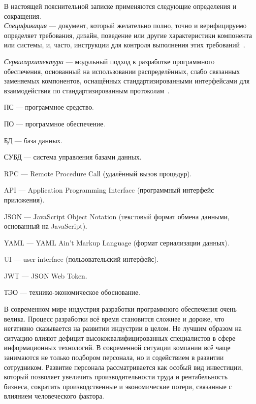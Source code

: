 \label{sec:definitions}
\label{sec:introduction}
\setcounter{page}{6}

В настоящей пояснительной записке применяются следующие определения и сокращения.
\\

\emph{Спецификация} — документ, который желательно полно, точно и верифицируемо определяет требования, дизайн, поведение или другие характеристики компонента или системы, и, часто, инструкции для контроля выполнения этих требований~\cite{istqb_specification}.

\emph{Сервис архитектура} — модульный подход к разработке программного обеспечения, основанный на использовании распределённых, слабо связанных заменяемых компонентов, оснащённых стандартизированными интерфейсами для взаимодействия по стандартизированным протоколам~\cite{wiki_soa}.

ПС — программное средство.

ПО — программное обеспечение.

БД — база данных.

СУБД — система управления базами данных.

RPC — Remote Procedure Call (удалённый вызов процедур).

API — Application Programming Interface (программный интерфейс приложения).

JSON — JavaScript Object Notation (текстовый формат обмена данными, основанный на JavaScript).

YAML — YAML Ain't Markup Language (формат сериализации данных).

UI — user interface (пользовательский интерфейс).

JWT — JSON Web Token.

ТЭО — технико-экономическое обоснование.

\newpage

\label{sec:introduction}

В современном мире индустрия разработки программного обеспечения очень велика. Процесс разработки всё время становится сложнее и дороже, что негативно сказывается на развитии индустрии в целом. Не лучшим образом на ситуацию влияют дефицит высококвалифицированных специалистов в сфере информационных технологий. В современной ситуации компании всё чаще занимаются не только подбором персонала, но и содействием в развитии сотрудником. Развитие персонала рассматривается как особый вид инвестиции, который позволяет увеличить производительности труда и рентабельность бизнеса, сократить производственные и экономические потери, связанные с влиянием человеческого фактора.

